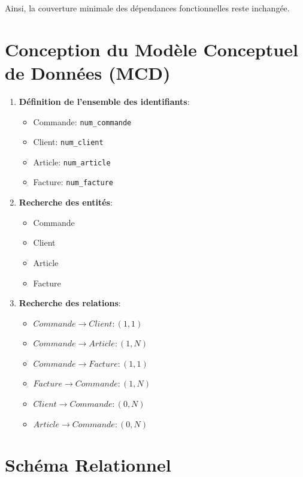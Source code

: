 \documentclass[a4paper,11pt]{article}
\begin{document}
Ainsi, la couverture minimale des dépendances fonctionnelles reste inchangée.

\section{Conception du Modèle Conceptuel de Données (MCD)}

\begin{enumerate}
    \item \textbf{Définition de l’ensemble des identifiants}: 
    \begin{itemize}
        \item Commande: \texttt{num\_commande}
        \item Client: \texttt{num\_client}
        \item Article: \texttt{num\_article}
        \item Facture: \texttt{num\_facture}
    \end{itemize}
    \item \textbf{Recherche des entités}:
    \begin{itemize}
        \item Commande
        \item Client
        \item Article
        \item Facture
    \end{itemize}
    \item \textbf{Recherche des relations}:
    \begin{itemize}
        \item$Commande \rightarrow Client: (1,1)$
        \item $Commande \rightarrow Article: (1,N)$
        \item $Commande \rightarrow Facture: (1,1)$
        \item $Facture \rightarrow Commande: (1,N)$
        \item $Client \rightarrow Commande: (0,N)$
        \item $Article \rightarrow Commande: (0,N)$
    \end{itemize}
\end{enumerate}

\section{Schéma Relationnel}
\end{document}
